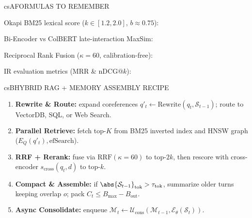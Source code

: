 \documentclass[../../../../master.tex]{subfiles}
\begin{document}
\begin{cscolumns}
\begin{cscard}{csA}{FORMULAS TO REMEMBER}
  \begin{csbul}
    \item Okapi BM25 lexical score ($k\in[1.2,2.0]$, $b\approx 0.75$):
    \item Bi-Encoder vs ColBERT late-interaction MaxSim:
    \item Reciprocal Rank Fusion ($\kappa=60$, calibration-free):
    \item IR evaluation metrics ($\mathrm{MRR}$ \& $\mathrm{nDCG}@k$):
  \end{csbul}
\end{cscard}

\begin{cscard}{csB}{HYBRID RAG + MEMORY ASSEMBLY RECIPE}
  \begin{enumerate}[leftmargin=1.2em, itemsep=1pt, topsep=1pt, parsep=0pt]
    \item \textbf{Rewrite \& Route:} expand coreferences $q'_t\leftarrow\mathrm{Rewrite}(q_t,\mathcal{S}_{t-1})$; route to VectorDB, SQL, or Web Search.
    \item \textbf{Parallel Retrieve:} fetch top-$K$ from BM25 inverted index and HNSW graph ($E_Q(q'_t),\mathrm{efSearch}$).
    \item \textbf{RRF + Rerank:} fuse via $\mathrm{RRF}(\kappa=60)$ to top-$2k$, then rescore with cross-encoder $s_{\mathrm{cross}}(q_t,d)$ to top-$k$.
    \item \textbf{Compact \& Assemble:} if $\abs{\mathcal{S}_{t-1}}_{\mathrm{tok}}>\tau_{\mathrm{tok}}$, summarize older turns keeping overlap $o$; pack $C_t\le B_{\max}-B_{\mathrm{out}}$.
    \item \textbf{Async Consolidate:} enqueue $\mathcal{M}_t\leftarrow\mathcal{U}_{\mathrm{cons}}(\mathcal{M}_{t-1},\mathcal{E}_\theta(\mathcal{S}_t))$.
  \end{enumerate}
\end{cscard}
\columnbreak


\end{cscolumns}
\end{document}
